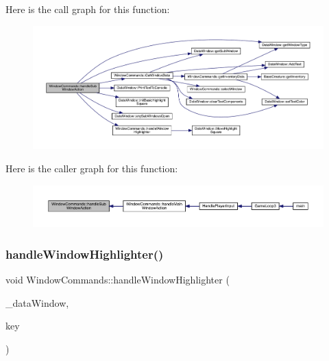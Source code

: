 Here is the call graph for this function\+:
\nopagebreak
\begin{figure}[H]
\begin{center}
\leavevmode
\includegraphics[width=350pt]{da/d07/class_window_commands_a1c45c8c693e631b581eeb355176a49e7_cgraph}
\end{center}
\end{figure}
Here is the caller graph for this function\+:
\nopagebreak
\begin{figure}[H]
\begin{center}
\leavevmode
\includegraphics[width=350pt]{da/d07/class_window_commands_a1c45c8c693e631b581eeb355176a49e7_icgraph}
\end{center}
\end{figure}
\mbox{\label{class_window_commands_a579bde80c82ababdcdbf271ccefd30b5}} 
\subsubsection{\texorpdfstring{handle\+Window\+Highlighter()}{handleWindowHighlighter()}}
{\footnotesize\ttfamily void Window\+Commands\+::handle\+Window\+Highlighter (\begin{DoxyParamCaption}\item[{\mbox{\hyperlink{class_data_window}{Data\+Window}} \&}]{\+\_\+data\+Window,  }\item[{sf\+::\+Keyboard\+::\+Key}]{key }\end{DoxyParamCaption})}


